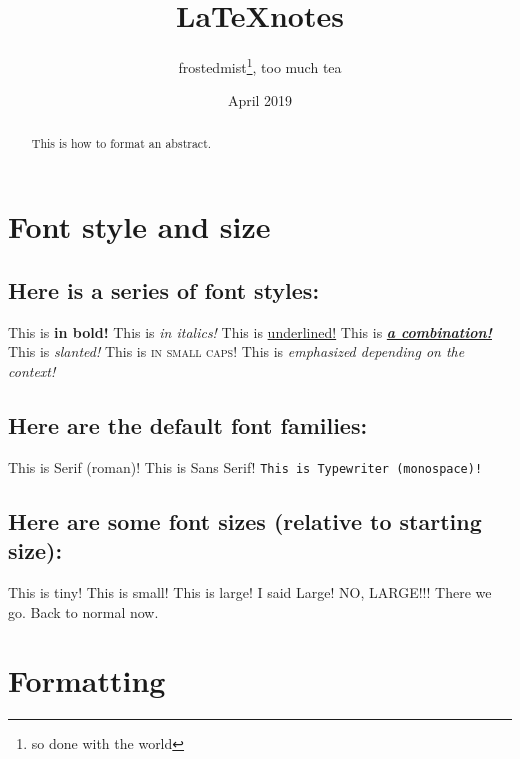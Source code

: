 \documentclass[12pt, letterpaper]{article} %
\title{\LaTeX notes} %
\author{frostedmist\thanks{so done with the world}, too much tea}
\date{April 2019} %
\begin{document}

\maketitle %

\section{Font style and size}

\subsection*{Here is a series of font styles:}

This is \textbf{in bold!} 
This is \textit{in italics!}
This is \underline{underlined!}
This is \textbf{\textit{\underline{a combination!}}}
This is \textsl{slanted!}
This is \textsc{in small caps!}
This is \emph{emphasized depending on the context!} %

\subsection*{Here are the default font families:}

\textrm{This is Serif (roman)!}
\textsf{This is Sans Serif!}
\texttt{This is Typewriter (monospace)!}

\subsection*{Here are some font sizes (relative to starting size):} 

\tiny{This is tiny!}
\small{This is small!}
\large{This is large!}
\Large{I said Large!}
\LARGE{NO, LARGE!!!}
\huge{There we go.}
\normalsize{Back to normal now.}

\clearpage %

\section{Formatting}

\begin{abstract}
	This is how to format an abstract.
\end{abstract}
\end{document}
